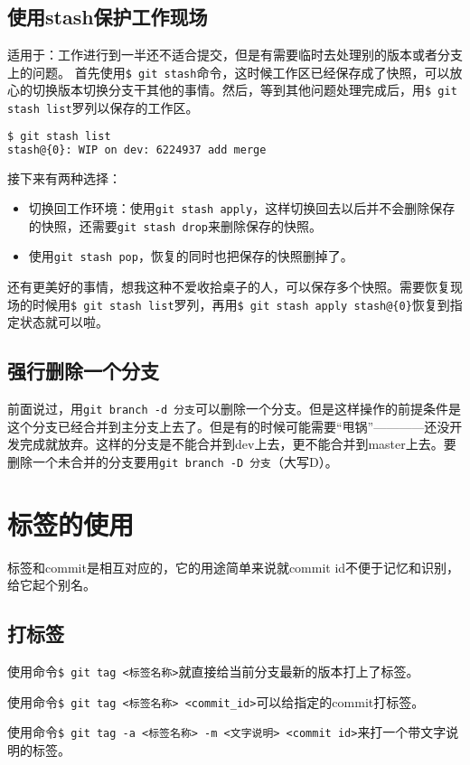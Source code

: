 \documentclass[UTF8]{ctexart}
\begin{document}
\subsection{使用stash保护工作现场}
适用于：工作进行到一半还不适合提交，但是有需要临时去处理别的版本或者分支上的问题。
首先使用\verb!$ git stash!命令，这时候工作区已经保存成了快照，可以放心的切换版本切换分支干其他的事情。然后，等到其他问题处理完成后，用\verb!$ git stash list!罗列以保存的工作区。
\begin{lstlisting}[language=bash]
$ git stash list
stash@{0}: WIP on dev: 6224937 add merge
\end{lstlisting}

接下来有两种选择：
\begin{itemize}
\item 切换回工作环境：使用\verb!git stash apply!，这样切换回去以后并不会删除保存的快照，还需要\verb!git stash drop!来删除保存的快照。
\item 使用\verb!git stash pop!，恢复的同时也把保存的快照删掉了。
\end{itemize}

还有更美好的事情，想我这种不爱收拾桌子的人，可以保存多个快照。需要恢复现场的时候用\verb!$ git stash list!罗列，再用\verb!$ git stash apply stash@{0}!恢复到指定状态就可以啦。

\subsection{强行删除一个分支}
前面说过，用\verb!git branch -d 分支!可以删除一个分支。但是这样操作的前提条件是这个分支已经合并到主分支上去了。但是有的时候可能需要“甩锅”————还没开发完成就放弃。这样的分支是不能合并到dev上去，更不能合并到master上去。要删除一个未合并的分支要用\verb!git branch -D 分支!（大写D）。

\section{标签的使用}
标签和commit是相互对应的，它的用途简单来说就commit id不便于记忆和识别，给它起个别名。
\subsection{打标签}
使用命令\verb!$ git tag <标签名称>!就直接给当前分支最新的版本打上了标签。

使用命令\verb!$ git tag <标签名称> <commit_id>!可以给指定的commit打标签。

使用命令\verb!$ git tag -a <标签名称> -m <文字说明> <commit id>!来打一个带文字说明的标签。
\end{document}

